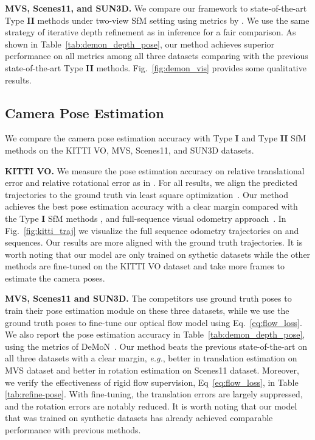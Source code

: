 \documentclass[final]{cvpr}
\def\eg{\emph{e.g.}}
\begin{document}
\textbf{MVS, Scenes11, and SUN3D.} 
We compare our framework to state-of-the-art Type \textbf{II} methods under two-view SfM setting using metrics by \cite{ummenhofer2017demon}. We use the same strategy of iterative depth refinement as \cite{wei2019deepsfm} in inference for a fair comparison. As shown in Table~\ref{tab:demon_depth_pose}, our method achieves superior performance on all metrics among all three datasets comparing with the previous state-of-the-art Type \textbf{II} methods. Fig.~\ref{fig:demon_vis} provides some qualitative results.


\subsection{Camera Pose Estimation}
We compare the camera pose estimation accuracy with Type \textbf{I} and Type \textbf{II} SfM methods on the KITTI VO, MVS, Scenes11, and SUN3D datasets.

\textbf{KITTI VO.} We measure the pose estimation accuracy on relative translational error  and relative rotational error  as in \cite{zou2020learning}. For all results, we align the predicted trajectories to the ground truth via least square optimization~\cite{umeyama1991least}. Our method achieves the best pose estimation accuracy with a clear margin compared with the Type \textbf{I} SfM methods \cite{sfmlearner,GANVO, Ranjan_2019_CVPR}, and full-sequence visual odometry approach~\cite{zou2020learning}. In Fig.~\ref{fig:kitti_traj} we visualize the full sequence odometry trajectories on  and  sequences. Our results are more aligned with the ground truth trajectories. It is worth noting that our model are only trained on sythetic datasets while the other methods are fine-tuned on the KITTI VO dataset and take more frames to estimate the camera poses.

\textbf{MVS, Scenes11 and SUN3D.} 
The competitors use ground truth poses to train their pose estimation module on these three datasets, while we use the ground truth poses to fine-tune our optical flow model using Eq.~\eqref{eq:flow_loss}. 
We also report the pose estimation accuracy in Table~\ref{tab:demon_depth_pose}, using the metrics of DeMoN~\cite{ummenhofer2017demon}. Our method beats the previous state-of-the-art on all three datasets with a clear margin, \eg,  better in translation estimation on MVS dataset and  better in rotation estimation on Scenes11 dataset. Moreover, we verify the effectiveness of rigid flow supervision, Eq~\eqref{eq:flow_loss}, in Table \ref{tab:refine-pose}. With fine-tuning, the translation errors are largely suppressed, and the rotation errors are notably reduced. It is worth noting that our model that was trained on synthetic datasets has already achieved comparable performance with previous methods.
\end{document}
